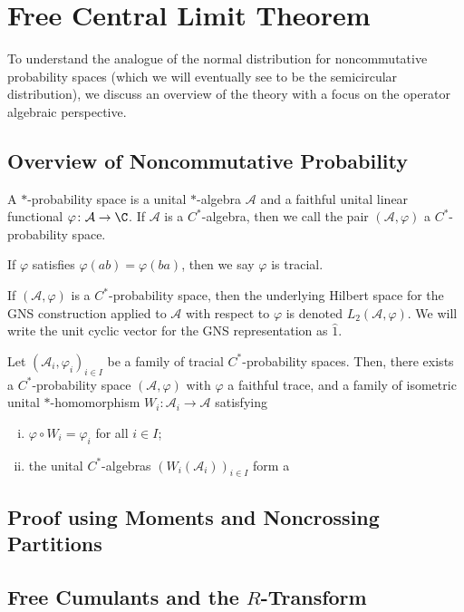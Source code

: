 \documentclass[10pt]{mypackage}
\begin{document}
\section{Free Central Limit Theorem}%
To understand the analogue of the normal distribution for noncommutative probability spaces (which we will eventually see to be the semicircular distribution), we discuss an overview of the theory with a focus on the operator algebraic perspective.
\subsection{Overview of Noncommutative Probability}%
\begin{definition}
  A $\ast$-probability space is a unital $\ast$-algebra $\mathcal{A}$ and a faithful unital linear functional $\varphi\colon \mathcal{A}\rightarrow \C$. If $\mathcal{A}$ is a $C^{\ast}$-algebra, then we call the pair $\left( \mathcal{A},\varphi \right)$ a $C^{\ast}$-probability space.

  If $\varphi$ satisfies $\varphi\left( ab \right) = \varphi\left( ba \right)$, then we say $\varphi$ is tracial.
\end{definition}
\begin{definition}
  If $\left( \mathcal{A},\varphi \right)$ is a $C^{\ast}$-probability space, then the underlying Hilbert space for the GNS construction applied to $\mathcal{A}$ with respect to $\varphi$ is denoted $L_2\left( \mathcal{A},\varphi \right)$. We will write the unit cyclic vector for the GNS representation as $\hat{1}$.
\end{definition}
\begin{theorem}
  Let $\left( \mathcal{A}_i,\varphi_i \right)_{i\in I}$ be a family of tracial $C^{\ast}$-probability spaces. Then, there exists a $C^{\ast}$-probability space $\left( \mathcal{A},\varphi \right)$ with $\varphi$ a faithful trace, and a family of isometric unital $\ast$-homomorphism $W_i\colon \mathcal{A}_i\rightarrow \mathcal{A}$ satisfying
  \begin{enumerate}[(i)]
    \item $\varphi\circ W_i = \varphi_i$ for all $i\in I$;
    \item the unital $C^{\ast}$-algebras $\left( W_i\left( \mathcal{A}_i \right) \right)_{i\in I}$ form a 
  \end{enumerate}
\end{theorem}
\subsection{Proof using Moments and Noncrossing Partitions}%

\subsection{Free Cumulants and the $R$-Transform}%
\nocite{billingsley_probability_and_measure,lectures_combinatorics_free_probability}
\printbibliography
\end{document}
